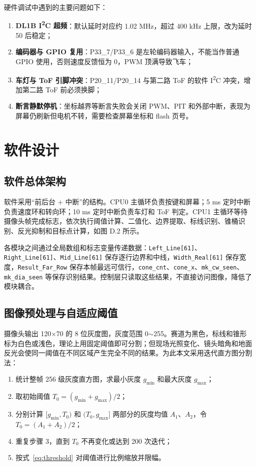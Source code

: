\documentclass{MaiTechReport}
\begin{document}
硬件调试中遇到的主要问题如下：
\begin{enumerate}
  \item \textbf{DL1B I\textsuperscript{2}C 超频}：默认延时对应约 1.02 MHz，超过 400 kHz 上限，改为延时 50 后稳定；
  \item \textbf{编码器与 GPIO 复用}：P33\_7/P33\_6 是左轮编码器输入，不能当作普通 GPIO 使用，否则速度反馈恒为 0，PWM 顶满导致飞车；
  \item \textbf{车灯与 ToF 引脚冲突}：P20\_11/P20\_14 与第二路 ToF 的软件 I\textsuperscript{2}C 冲突，增加第二路 ToF 前必须换脚；
  \item \textbf{断言静默停机}：坐标越界等断言失败会关闭 PWM、PIT 和外部中断，表现为屏幕仍刷新但电机不转，需要检查屏幕坐标和 flash 页号。
\end{enumerate}

\section{软件设计}
\label{sec:software}

\subsection{软件总体架构}
软件采用“前后台 + 中断”的结构。CPU0 主循环负责按键和屏幕；5 ms 定时中断负责速度环和转向环；10 ms 定时中断负责车灯和 ToF 判定。CPU1 主循环等待摄像头帧完成标志，依次执行阈值计算、二值化、边界提取、标线识别、锥桶识别、反光抑制和目标点计算，如图 D.2 所示。



各模块之间通过全局数组和标志变量传递数据：\texttt{Left\_Line[61]}、\texttt{Right\_Line[61]}、\texttt{Mid\_Line[61]} 保存逐行边界和中线，\texttt{Width\_Real[61]} 保存宽度，\texttt{Result\_Far\_Row} 保存本帧最远可信行，\texttt{cone\_cnt}、\texttt{cone\_x}、\texttt{mk\_cw\_seen}、\texttt{mk\_dia\_seen} 等保存识别结果。控制层只读取这些结果，不直接访问图像，降低了模块耦合。

\subsection{图像预处理与自适应阈值}
摄像头输出 120$\times$70 的 8 位灰度图，灰度范围 0$\sim$255。赛道为黑色，标线和锥形标为白色或浅色，理论上用固定阈值即可分割；但现场光照变化、镜头暗角和地面反光会使同一阈值在不同区域产生完全不同的结果。为此本文采用迭代直方图分割法：

\begin{enumerate}
  \item 统计整帧 256 级灰度直方图，求最小灰度 $g_{\min}$ 和最大灰度 $g_{\max}$；
  \item 取初始阈值 $T_0=(g_{\min}+g_{\max})/2$；
  \item 分别计算 $[g_{\min},T_0)$ 和 $(T_0,g_{\max}]$ 两部分的灰度均值 $A_1$、$A_2$，令 $T_0=(A_1+A_2)/2$；
  \item 重复步骤 3，直到 $T_0$ 不再变化或达到 200 次迭代；
  \item 按式~\eqref{eq:threshold} 对阈值进行比例缩放并限幅。
\end{enumerate}
\end{document}
